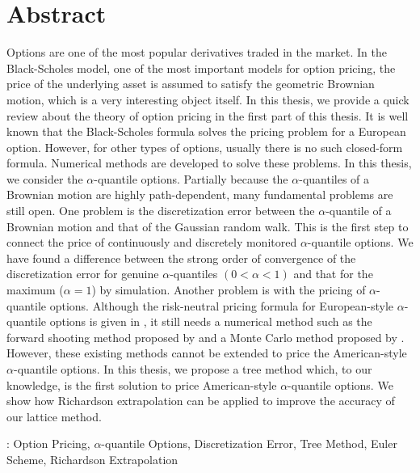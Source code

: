 \chapter{Abstract}
Options are one of the most popular derivatives traded in the market. 
In the Black-Scholes model, one of the most important models for option pricing, the price of the underlying asset is assumed to satisfy the geometric Brownian motion, which is a very interesting object itself. In this thesis, we provide a quick review about the theory of option pricing in the first part of this thesis. It is well known that the Black-Scholes formula solves the pricing problem for a European option. However, for other types of options, usually there is no such closed-form formula. Numerical methods are developed to solve these problems. In this thesis, we consider the $\alpha$-quantile options. Partially because the $\alpha$-quantiles of a Brownian motion are highly path-dependent, many fundamental problems are still open. One problem is the discretization error between the $\alpha$-quantile of a Brownian motion and that of the Gaussian random walk. This is the first step to connect the price of continuously and discretely monitored $\alpha$-quantile options. We have found a difference between the strong order of convergence of the discretization error for genuine $\alpha$-quantiles $(0< \alpha < 1)$ and that for the maximum ($\alpha=1$) by simulation. Another problem is with the pricing of $\alpha$-quantile options. Although the risk-neutral pricing formula for European-style $\alpha$-quantile options is given in \cite{Dassios1995}, it still needs a numerical method such as the forward shooting method proposed by \cite{Kwok2001} and a Monte Carlo method proposed by \cite{Laura2001}. However, these existing methods cannot be extended to price the American-style $\alpha$-quantile options. In this thesis, we propose a tree method which, to our knowledge, is the first solution to price American-style $\alpha$-quantile options. We show how Richardson extrapolation can be applied to improve the accuracy of our lattice method. 
\vspace{1cm}

: Option Pricing, $\alpha$-quantile Options, Discretization Error, Tree Method, Euler Scheme, Richardson Extrapolation
